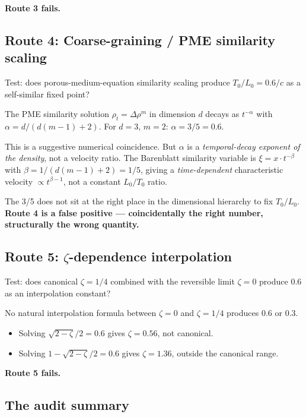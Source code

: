 \documentclass[11pt,a4paper]{article}
\begin{document}
\textbf{Route 3 fails.}

\subsection{Route 4: Coarse-graining / PME similarity scaling}

Test: does porous-medium-equation similarity scaling produce $T_0/L_0 = 0.6/c$ as a self-similar fixed point?

The PME similarity solution $\rho_t = \Delta \rho^{m}$ in dimension $d$ decays as $t^{-\alpha}$ with $\alpha = d/(d(m-1)+2)$. For $d = 3$, $m = 2$: $\alpha = 3/5 = 0.6$.

This is a suggestive numerical coincidence. But $\alpha$ is a \emph{temporal-decay exponent of the density}, not a velocity ratio. The Barenblatt similarity variable is $\xi = x \cdot t^{-\beta}$ with $\beta = 1/(d(m-1)+2) = 1/5$, giving a \emph{time-dependent} characteristic velocity $\propto t^{\beta-1}$, not a constant $L_0/T_0$ ratio.

The 3/5 does not sit at the right place in the dimensional hierarchy to fix $T_0/L_0$. \textbf{Route 4 is a false positive --- coincidentally the right number, structurally the wrong quantity.}

\subsection{Route 5: $\zeta$-dependence interpolation}

Test: does canonical $\zeta = 1/4$ combined with the reversible limit $\zeta = 0$ produce 0.6 as an interpolation constant?

No natural interpolation formula between $\zeta = 0$ and $\zeta = 1/4$ produces 0.6 or 0.3.

\begin{itemize}[noitemsep]
\item Solving $\sqrt{2-\zeta}/2 = 0.6$ gives $\zeta = 0.56$, not canonical.
\item Solving $1 - \sqrt{2-\zeta}/2 = 0.6$ gives $\zeta = 1.36$, outside the canonical range.
\end{itemize}

\textbf{Route 5 fails.}

\subsection{The audit summary}
\end{document}
